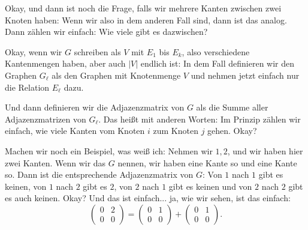 \begin{spoken-clean}[00:30:10 - 00:33:00]
Okay, und dann ist noch die Frage, falls wir mehrere Kanten zwischen zwei Knoten haben: Wenn wir also in dem anderen Fall sind, dann ist das analog. Dann zählen wir einfach: Wie viele gibt es dazwischen?

Okay, wenn wir $G$ schreiben als $V$ mit $E_1$ bis $E_k$, also verschiedene Kantenmengen haben, aber auch $|V|$ endlich ist: In dem Fall definieren wir den Graphen $G_\ell$ als den Graphen mit Knotenmenge $V$ und nehmen jetzt einfach nur die Relation $E_\ell$ dazu.

Und dann definieren wir die Adjazenzmatrix von $G$ als die Summe aller Adjazenzmatrizen von $G_\ell$. Das heißt mit anderen Worten: Im Prinzip zählen wir einfach, wie viele Kanten vom Knoten $i$ zum Knoten $j$ gehen. Okay?

Machen wir noch ein Beispiel, was weiß ich: Nehmen wir $1, 2$, und wir haben hier zwei Kanten. Wenn wir das $G$ nennen, wir haben eine Kante so und eine Kante so. Dann ist die entsprechende Adjazenzmatrix von $G$: Von $1$ nach $1$ gibt es keinen, von $1$ nach $2$ gibt es $2$, von $2$ nach $1$ gibt es keinen und von $2$ nach $2$ gibt es auch keinen. Okay? Und das ist einfach... ja, wie wir sehen, ist das einfach:
\[
\begin{pmatrix} 0 & 2 \\ 0 & 0 \end{pmatrix} = \begin{pmatrix} 0 & 1 \\ 0 & 0 \end{pmatrix} + \begin{pmatrix} 0 & 1 \\ 0 & 0 \end{pmatrix}.
\]
\end{spoken-clean}

